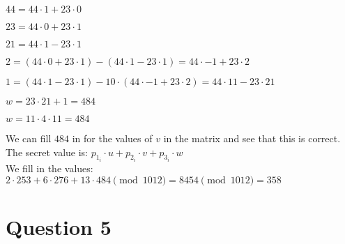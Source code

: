 \documentclass{article}
\begin{document}
$44 = 44 \cdot 1 + 23 \cdot 0$

$23 = 44 \cdot 0 + 23 \cdot 1$

$21 = 44 \cdot 1 - 23 \cdot 1$

$2 = (44 \cdot 0 + 23 \cdot 1) - (44 \cdot 1 - 23 \cdot 1) = 44 \cdot -1 + 23 \cdot 2 $

$1 = (44 \cdot 1 - 23 \cdot 1) - 10 \cdot (44 \cdot -1 + 23 \cdot 2) = 44 \cdot 11 - 23 \cdot 21$

$w = 23 \cdot 21 + 1 = 484$

$w = 11 \cdot 4 \cdot 11 = 484$

We can fill $484$ in for the values of $v$ in the matrix and see that this is correct.\\

The secret value is: $p_{1}_{i} \cdot u + p_{2}_{i} \cdot v + p_{3}_{i} \cdot w$\\
We fill in the values: $ 2 \cdot 253 + 6 \cdot 276 + 13 \cdot 484 \pmod{1012} = 8454 \pmod{1012} = 358$

\section{Question 5}
\end{document}
